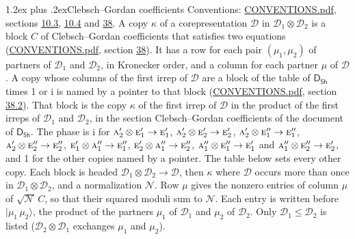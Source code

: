 \documentclass[10pt,a4paper]{article}
\makeatletter
\renewcommand\section{\@startsection{section}{1}{\z@}{-3ex plus -1ex minus -.2ex}%
  {1.2ex plus .2ex}{\normalfont\large\sffamily\bfseries\color{parttitle}}}
\numberwithin{equation}{section}
\newcommand{\grp}[1]{\mathsf{#1}}
\newcommand{\irr}[1]{\text{\normalfont\scshape #1}}
\newcommand{\iunit}{\mathrm{i}}
\newcommand{\irrprod}{\otimes}
\newcommand{\mult}{\kappa}
\newcommand{\intx}{\mu}
\newcommand{\cgnorm}{\mathcal{N}}
\newcommand{\prodket}[2]{\lvert {#1}\,{#2}\rangle}
\makeatother
\begin{document}
\section{Clebsch--Gordan coefficients}\label{s:clebsch_gordan}
Conventions: \href{../../CONVENTIONS.pdf}{CONVENTIONS.pdf}, sections \href{../../../rotation/CONVENTIONS.pdf\#conv.10.3}{10.3}, \href{../../../rotation/CONVENTIONS.pdf\#conv.10.4}{10.4} and \href{../../CONVENTIONS.pdf\#conv.38}{38}.
\leavevmode\label{n:index.copy}\label{n:matrix.cg.stored}A copy $\mult$ of a corepresentation $\mathcal{D}$ in $\mathcal{D}_1\irrprod\mathcal{D}_2$ is a block $C$ of Clebsch--Gordan coefficients that satisfies two equations (\href{../../CONVENTIONS.pdf}{CONVENTIONS.pdf}, section \href{../../CONVENTIONS.pdf\#conv.38}{38}). \label{n:index.cg}It has a row for each pair $(\intx_1, \intx_2)$ of partners of $\mathcal{D}_1$ and $\mathcal{D}_2$, in Kronecker order, and a column for each partner $\intx$ of $\mathcal{D}$.
A copy whose columns of the first irrep of $\mathcal{D}$ are a block of the table of $\grp{D_{5h}}$ times 1 or $\iunit$ is named by a pointer to that block (\href{../../CONVENTIONS.pdf}{CONVENTIONS.pdf}, section \href{../../CONVENTIONS.pdf\#conv.38.2}{38.2}). That block is the copy $\mult$ of the first irrep of $\mathcal{D}$ in the product of the first irreps of $\mathcal{D}_1$ and $\mathcal{D}_2$, in the section Clebsch--Gordan coefficients of the document of \href{../../../rotation/data/pdf/D5h.pdf}{$\grp{D_{5h}}$}. The phase is $\iunit$ for $\irr{a}_{2}'\irrprod \irr{e}_{1}'\to \irr{e}_{1}'$, $\irr{a}_{2}'\irrprod \irr{e}_{2}'\to \irr{e}_{2}'$, $\irr{a}_{2}'\irrprod \irr{e}_{1}''\to \irr{e}_{1}''$, $\irr{a}_{2}'\irrprod \irr{e}_{2}''\to \irr{e}_{2}''$, $\irr{e}_{1}'\irrprod \irr{a}_{1}''\to \irr{e}_{1}''$, $\irr{e}_{2}'\irrprod \irr{a}_{1}''\to \irr{e}_{2}''$, $\irr{a}_{1}''\irrprod \irr{e}_{1}''\to \irr{e}_{1}'$ and $\irr{a}_{1}''\irrprod \irr{e}_{2}''\to \irr{e}_{2}'$, and 1 for the other copies named by a pointer. The table below sets every other copy.
Each block is headed $\mathcal{D}_1\irrprod\mathcal{D}_2\to\mathcal{D}$, then $\mult$ where $\mathcal{D}$ occurs more than once in $\mathcal{D}_1\irrprod\mathcal{D}_2$, and a normalization $\cgnorm$. Row $\intx$ gives the nonzero entries of column $\intx$ of $\sqrt{\cgnorm}\,C$, so that their squared moduli sum to $\cgnorm$. \label{n:vector.ket.product}Each entry is written before $\prodket{\intx_1}{\intx_2}$, the product of the partners $\intx_1$ of $\mathcal{D}_1$ and $\intx_2$ of $\mathcal{D}_2$. Only $\mathcal{D}_1 \le \mathcal{D}_2$ is listed ($\mathcal{D}_2\irrprod\mathcal{D}_1$ exchanges $\intx_1$ and $\intx_2$).
\end{document}
